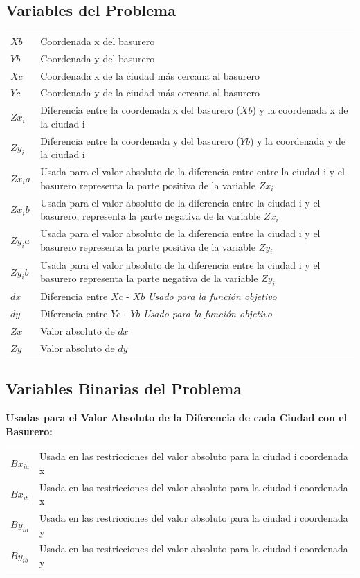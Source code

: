 \documentclass[10pt]{article}
\begin{document}
\subsection{Variables del Problema}
\begin{tabular}{p{1cm} p{}}
$Xb$ & Coordenada x del basurero \\
$Yb$ & Coordenada y del basurero \\
$Xc$ & Coordenada x de la ciudad m\'as cercana al basurero \\
$Yc$ & Coordenada y de la ciudad m\'as cercana al basurero \\
$Zx_i$ & Diferencia entre la coordenada x del basurero ($Xb$) y la coordenada x de la ciudad i\\
$Zy_i$ & Diferencia entre la coordenada y del basurero ($Yb$) y la coordenada y de la ciudad i\\
$Zx_ia$ & Usada para el valor absoluto de la diferencia entre entre la ciudad i y el basurero representa la parte positiva de la variable $Zx_i$\\
$Zx_ib$ & Usada para el valor absoluto de la diferencia entre la ciudad i y el basurero, representa la parte negativa de la variable $Zx_i$\\
$Zy_ia$ & Usada para el valor absoluto de la diferencia entre la ciudad i y el basurero representa la parte positiva de la variable $Zy_i$\\
$Zy_ib$ & Usada para el valor absoluto de la diferencia entre la ciudad i y el basurero representa la parte negativa de la variable $Zy_i$\\
$dx$ & Diferencia entre $Xc$ - $Xb$ \emph{Usado para la funci\'on objetivo}\\
$dy$ &  Diferencia entre $Yc$ - $Yb$ \emph{Usado para la funci\'on objetivo}\\
$Zx$ & Valor absoluto de $dx$\\
$Zy$ & Valor absoluto de $dy$ \\
\end{tabular}


\subsection{Variables Binarias del Problema}
\textbf{Usadas para el Valor Absoluto de la Diferencia de cada Ciudad con el Basurero: }\\

\begin{tabular}{l l }
 $Bx_{ia}$ & Usada en las restricciones del valor absoluto para la ciudad i coordenada x \\
$Bx_{ib}$ & Usada en las restricciones del valor absoluto para la ciudad i  coordenada x \\
$By_{ia}$ & Usada en las restricciones del valor absoluto para la ciudad i coordenada y \\
$By_{ib}$ & Usada en las restricciones del valor absoluto para la ciudad i coordenada y \\

\end{tabular}\bigskip 
\end{document}
